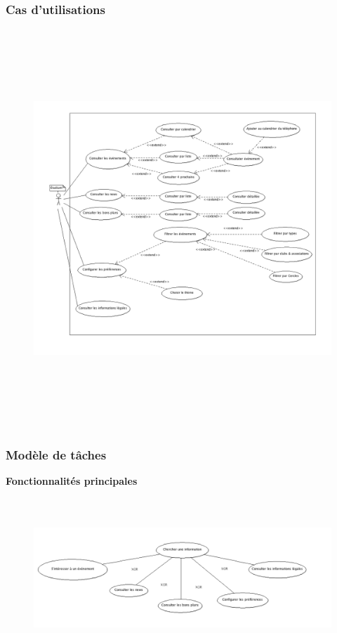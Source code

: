 \documentclass[a4paper, 11px]{article}
\begin{document}
\subsubsection{Cas d'utilisations}
\begin{figure}[h!]
\includegraphics[width=20cm,height=15cm]{cas_utilisation.png}
\end{figure}

\newpage

\subsubsection{Modèle de tâches}
\vfill
\textbf{Fonctionnalités principales}
\begin{figure}[h!]
\includegraphics[width=18cm,height=6cm]{taches_generales.png}
\end{figure}
\end{document}
